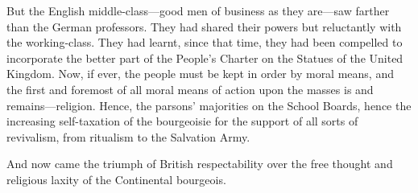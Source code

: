But the English middle-class---good men of business as they are---saw farther
than the German professors. They had shared their powers but reluctantly with
the working-class. They had learnt, since that time, they had been compelled to
incorporate the better part of the People's Charter on the Statues of the United
Kingdom. Now, if ever, the people must be kept in order by moral means, and the
first and foremost of all moral means of action upon the masses is and
remains---religion. Hence, the parsons' majorities on the School Boards, hence
the increasing self-taxation of the bourgeoisie for the support of all sorts of
revivalism, from ritualism to the Salvation Army.

And now came the triumph of British respectability over the free thought and
religious laxity of the Continental bourgeois.

\printendnotes
